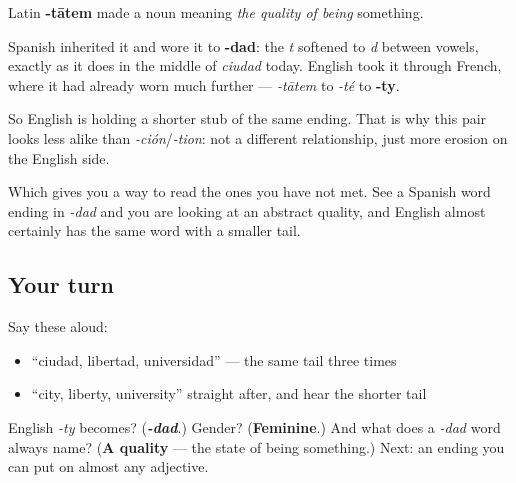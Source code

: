 \begin{cousinweb}
Latin \textbf{-tātem} made a noun meaning \emph{the quality of being} something.

Spanish inherited it and wore it to \textbf{-dad}: the \emph{t} softened to \emph{d} between vowels, exactly as it does in the middle of \emph{ciudad} today. English took it through French, where it had already worn much further — \emph{-tātem} to \emph{-té} to \textbf{-ty}.

So English is holding a shorter stub of the same ending. That is why this pair looks less alike than \emph{-ción}/\emph{-tion}: not a different relationship, just more erosion on the English side.

Which gives you a way to read the ones you have not met. See a Spanish word ending in \emph{-dad} and you are looking at an abstract quality, and English almost certainly has the same word with a smaller tail.
\end{cousinweb}

\subsection*{Your turn}
Say these aloud:

\begin{itemize}
\raggedright
  \item \textquotedblleft{}ciudad, libertad, universidad\textquotedblright{} — the same tail three times
  \item \textquotedblleft{}city, liberty, university\textquotedblright{} straight after, and hear the shorter tail
\end{itemize}

\begin{tcolorbox}[breakable,colback=teal!4,colframe=teal!35!black,title={Before you move on}]
English \emph{-ty} becomes? (\emph{\textbf{-dad}}.) Gender? (\textbf{Feminine}.) And what does a \emph{-dad} word always name? (\textbf{A quality} — the state of being something.) Next: an ending you can put on almost any adjective.
\end{tcolorbox}
